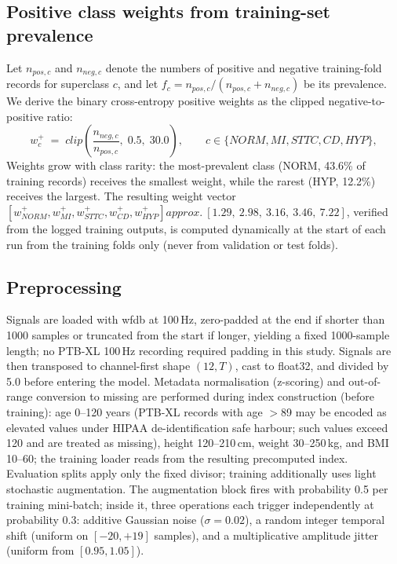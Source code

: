 \documentclass[mathematics,article,pdftex]{Definitions/mdpi}
\def\texttt#1{#1}%
\def\mathrm#1{#1}%
\def\approx{approx.\ }%
\begin{document}
\subsection{Positive class weights from training-set prevalence}
Let $n_{\mathrm{pos},c}$ and $n_{\mathrm{neg},c}$ denote the numbers of positive and negative training-fold records for superclass $c$, and let $f_c = n_{\mathrm{pos},c}/(n_{\mathrm{pos},c}+n_{\mathrm{neg},c})$ be its prevalence. We derive the binary cross-entropy positive weights as the clipped negative-to-positive ratio:
\begin{equation}\label{eq:posweights}
w_c^{+} \;=\; \mathrm{clip}\!\left(\frac{n_{\mathrm{neg},c}}{n_{\mathrm{pos},c}},\;0.5,\;30.0\right), \qquad c\in\{\mathrm{NORM},\mathrm{MI},\mathrm{STTC},\mathrm{CD},\mathrm{HYP}\},
\end{equation}
Weights grow with class rarity: the most-prevalent class (NORM, 43.6\% of training records) receives the smallest weight, while the rarest (HYP, 12.2\%) receives the largest. The resulting weight vector $[w_{\mathrm{NORM}}^+, w_{\mathrm{MI}}^+, w_{\mathrm{STTC}}^+, w_{\mathrm{CD}}^+, w_{\mathrm{HYP}}^+] \approx [1.29,\ 2.98,\ 3.16,\ 3.46,\ 7.22]$, verified from the logged training outputs, is computed dynamically at the start of each run from the training folds only (never from validation or test folds).

\subsection{Preprocessing}
Signals are loaded with \texttt{wfdb} at 100\,Hz, zero-padded at the end if shorter than 1000 samples or truncated from the start if longer, yielding a fixed 1000-sample length; no PTB-XL 100\,Hz recording required padding in this study. Signals are then transposed to channel-first shape $(12,T)$, cast to \texttt{float32}, and divided by 5.0 before entering the model. Metadata normalisation (z-scoring) and out-of-range conversion to missing are performed during index construction (before training): age 0--120 years (PTB-XL records with age $>$89 may be encoded as elevated values under HIPAA de-identification safe harbour; such values exceed 120 and are treated as missing), height 120--210\,cm, weight 30--250\,kg, and BMI 10--60; the training loader reads from the resulting precomputed index. Evaluation splits apply only the fixed divisor; training additionally uses light stochastic augmentation. The augmentation block fires with probability 0.5 per training mini-batch; inside it, three operations each trigger independently at probability 0.3: additive Gaussian noise ($\sigma{=}0.02$), a random integer temporal shift (uniform on $[-20,+19]$ samples), and a multiplicative amplitude jitter (uniform from $[0.95, 1.05]$).
\end{document}
